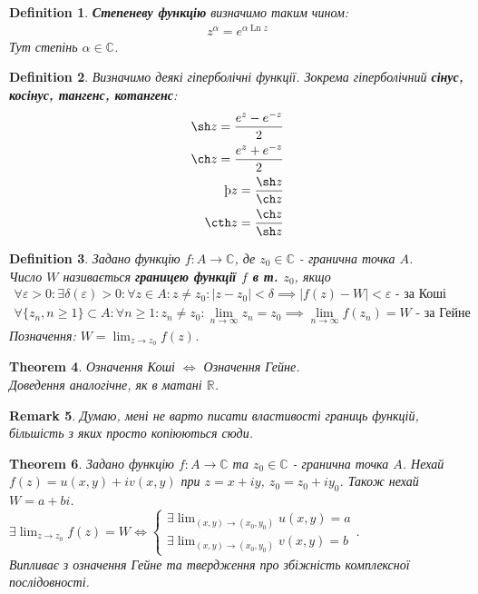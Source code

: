 \documentclass[a4paper, 10pt]{article}
\theoremstyle{theoremdd}
\newtheorem{theorem}{Theorem}[subsection]
\theoremstyle{theoremdd}
\newtheorem{definition}[theorem]{Definition}
\theoremstyle{theoremdd}
\theoremstyle{theoremdd}
\theoremstyle{theoremdd}
\theoremstyle{theoremdd}
\newtheorem{remark}[theorem]{Remark}
\theoremstyle{theoremdd}
\theoremstyle{theoremdd}
\DeclareMathOperator{\Ln}{Ln}
\begin{document}
\begin{definition}
\textbf{Степеневу функцію} визначимо таким чином:
\begin{align*}
z^\alpha = e^{\alpha \Ln z}
\end{align*}
Тут степінь $\alpha \in \mathbb{C}$.
\end{definition}

\begin{definition}
Визначимо деякі гіперболічні функції. Зокрема гіперболічний \textbf{сінус, косінус, тангенс, котангенс}:
\begin{align*}
\sh z = \dfrac{e^z-e^{-z}}{2} \\
\ch z = \dfrac{e^z + e^{-z}}{2} \\ 
\th z = \dfrac{\sh z}{\ch z} \\
\cth z = \dfrac{\ch z}{\sh z}
\end{align*}
\end{definition}

\begin{definition}
Задано функцію $f: A \to \mathbb{C}$, де $z_0 \in \mathbb{C}$ - гранична точка $A$.\\
Число $W$ називається \textbf{границею функції $f$ в т. $z_0$}, якщо
\begin{align*}
\forall \varepsilon > 0: \exists \delta(\varepsilon)>0: \forall z \in A: z \neq z_0: |z-z_0| < \delta \implies |f(z) - W| < \varepsilon \text{ - за Коші} \\
\forall \{z_n, n \geq 1 \} \subset A: \forall n \geq 1: z_n \neq z_0: \lim_{n \to \infty} z_n = z_0 \implies \lim_{n \to \infty} f(z_n) = W \text{ - за Гейне}
\end{align*}
Позначення: $W = \displaystyle\lim_{z \to z_0} f(z)$.
\end{definition}

\begin{theorem}
Означення Коші $\iff$ Означення Гейне.\\
\textit{Доведення аналогічне, як в матані $\mathbb{R}$.}
\end{theorem}

\begin{remark}
Думаю, мені не варто писати властивості границь функцій, більшість з яких просто копіюються сюди.
\end{remark}

\begin{theorem}
Задано функцію $f: A \to \mathbb{C}$ та $z_0 \in \mathbb{C}$ - гранична точка $A$. Нехай $f(z) = u(x,y) + i v(x,y)$ при $z = x+iy$, $z_0 = z_0+iy_0$. Також нехай $W = a+bi$.\\
$\displaystyle\exists \lim_{z \to z_0} f(z) = W \iff \begin{cases} \displaystyle\exists \lim_{(x,y) \to (x_0,y_0)} u(x,y) = a \\ \displaystyle\exists \lim_{(x,y) \to (x_0,y_0)} v(x,y) = b \end{cases}$.\\
\textit{Випливає з означення Гейне та твердження про збіжність комплексної послідовності.}
\end{theorem}
\end{document}
